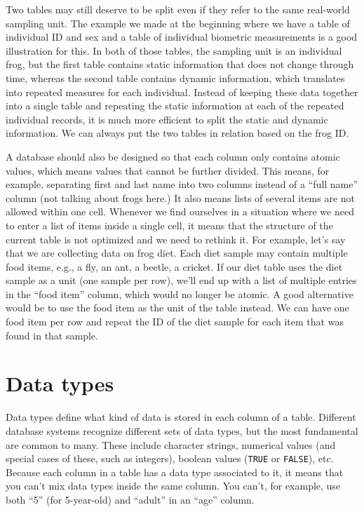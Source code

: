 \documentclass[
]{book}
\begin{document}
Two tables may still deserve to be split even if they refer to the same real-world sampling unit. The example we made at the beginning where we have a table of individual ID and sex and a table of individual biometric measurements is a good illustration for this. In both of those tables, the sampling unit is an individual frog, but the first table contains static information that does not change through time, whereas the second table contains dynamic information, which translates into repeated measures for each individual. Instead of keeping these data together into a single table and repeating the static information at each of the repeated individual records, it is much more efficient to split the static and dynamic information. We can always put the two tables in relation based on the frog ID.

A database should also be designed so that each column only contains atomic values, which means values that cannot be further divided. This means, for example, separating first and last name into two columns instead of a ``full name'' column (not talking about frogs here.) It also means lists of several items are not allowed within one cell. Whenever we find ourselves in a situation where we need to enter a list of items inside a single cell, it means that the structure of the current table is not optimized and we need to rethink it. For example, let's say that we are collecting data on frog diet. Each diet sample may contain multiple food items, e.g., a fly, an ant, a beetle, a cricket. If our diet table uses the diet sample as a unit (one sample per row), we'll end up with a list of multiple entries in the ``food item'' column, which would no longer be atomic. A good alternative would be to use the food item as the unit of the table instead. We can have one food item per row and repeat the ID of the diet sample for each item that was found in that sample.

\hypertarget{data-types}{%
\section{Data types}\label{data-types}}

Data types define what kind of data is stored in each column of a table. Different database systems recognize different sets of data types, but the most fundamental are common to many. These include character strings, numerical values (and special cases of these, such as integers), boolean values (\texttt{TRUE} or \texttt{FALSE}), etc. Because each column in a table has a data type associated to it, it means that you can't mix data types inside the same column. You can't, for example, use both ``5'' (for 5-year-old) and ``adult'' in an ``age'' column.
\end{document}

